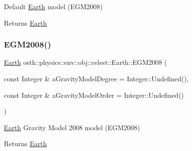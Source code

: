Default \hyperlink{classostk_1_1physics_1_1env_1_1obj_1_1celest_1_1_earth}{Earth} model (E\+G\+M2008) 

\begin{DoxyReturn}{Returns}
\hyperlink{classostk_1_1physics_1_1env_1_1obj_1_1celest_1_1_earth}{Earth} 
\end{DoxyReturn}
\mbox{\label{classostk_1_1physics_1_1env_1_1obj_1_1celest_1_1_earth_a41309c72eb9f74ecc37a502b00e89b9b}} 
\subsubsection{\texorpdfstring{E\+G\+M2008()}{EGM2008()}}
{\footnotesize\ttfamily \hyperlink{classostk_1_1physics_1_1env_1_1obj_1_1celest_1_1_earth}{Earth} ostk\+::physics\+::env\+::obj\+::celest\+::\+Earth\+::\+E\+G\+M2008 (\begin{DoxyParamCaption}\item[{const Integer \&}]{a\+Gravity\+Model\+Degree = {\ttfamily Integer\+:\+:Undefined()},  }\item[{const Integer \&}]{a\+Gravity\+Model\+Order = {\ttfamily Integer\+:\+:Undefined()} }\end{DoxyParamCaption})\hspace{0.3cm}{\ttfamily [static]}}



\hyperlink{classostk_1_1physics_1_1env_1_1obj_1_1celest_1_1_earth}{Earth} Gravity Model 2008 model (E\+G\+M2008) 

\begin{DoxyReturn}{Returns}
\hyperlink{classostk_1_1physics_1_1env_1_1obj_1_1celest_1_1_earth}{Earth} 
\end{DoxyReturn}
\mbox{\label{classostk_1_1physics_1_1env_1_1obj_1_1celest_1_1_earth_ac9e279bcd59917a3e153c52c74639005}} 

